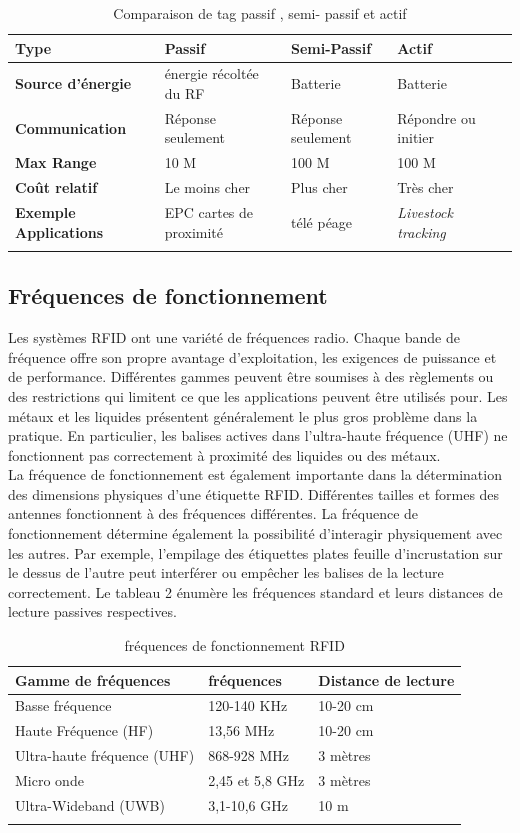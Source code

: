 \documentclass[11pt, a4paper, twoside]{book}
\begin{document}
\begin{longtable}{|p{}|p{}|p{}| p{}| p{}|}
\hline
\textbf{Type} & \textbf{Passif} & \textbf{Semi-Passif} & \textbf{Actif} \\
\hline
\textbf{Source d'énergie} & énergie récoltée du RF & Batterie & Batterie \\
\hline
\textbf{Communication} & Réponse seulement & Réponse seulement & Répondre ou initier \\
\hline
\textbf{Max Range} & 10 M & 100 M &  100 M \\
\hline
\textbf{Coût relatif} & Le moins cher & Plus cher & Très cher \\
\hline
\textbf{Exemple Applications} & EPC cartes de proximité & télé péage &  \emph {Livestock tracking} \\
\hline
\caption{Comparaison de tag passif , semi- passif et actif}
\end{longtable}


\subsection{Fréquences de fonctionnement}
Les systèmes RFID ont une variété de fréquences radio. Chaque bande de fréquence offre son propre avantage d'exploitation, les exigences de puissance et de performance. Différentes gammes peuvent être soumises à des règlements ou des restrictions qui limitent ce que les applications peuvent être utilisés pour.
Les métaux et les liquides présentent généralement le plus gros problème dans la pratique. En particulier, les balises actives dans l'ultra-haute fréquence (UHF) ne fonctionnent pas correctement à proximité des liquides ou des métaux.\\


La fréquence de fonctionnement est également importante dans la détermination des dimensions physiques d'une étiquette RFID. Différentes tailles et formes des antennes fonctionnent à des fréquences différentes. La fréquence de fonctionnement détermine également la possibilité d'interagir physiquement avec les autres. Par exemple, l'empilage des étiquettes plates feuille d'incrustation sur le dessus de l'autre peut interférer ou empêcher les balises de la lecture correctement. Le tableau 2 énumère les fréquences standard et leurs distances de lecture passives respectives.\\
\begin{longtable}{|p{}|p{}|p{}|}
\hline
\textbf{Gamme de fréquences} & \textbf{fréquences} & \textbf{Distance de lecture} \\
\hline
Basse fréquence & 120-140 KHz & 10-20 cm  \\
\hline
Haute Fréquence (HF) & 13,56 MHz & 10-20 cm \\
\hline
Ultra-haute fréquence (UHF) & 868-928 MHz & 3 mètres \\
\hline
Micro onde & 2,45 et 5,8 GHz & 3 mètres \\
\hline
Ultra-Wideband (UWB) & 3,1-10,6 GHz & 10 m \\
\hline
\caption{fréquences de fonctionnement RFID}
\end{longtable}
\end{document}
